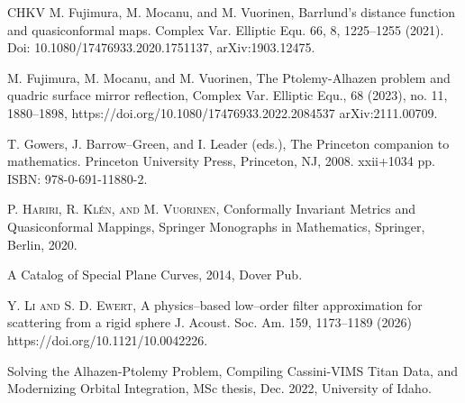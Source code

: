 \documentclass[12pt,a4paper]{amsart}
\theoremstyle{plain}
\theoremstyle{definition}
\theoremstyle{remark}
\numberwithin{equation}{section}
\begin{document}
\begin{thebibliography}{CHKV}
%
 {\sc
M. Fujimura, M. Mocanu, and M.  Vuorinen, } {Barrlund's distance function and
  quasiconformal maps}.
\newblock Complex Var. Elliptic Equ.  66,  8, 1225--1255 (2021).
\newblock Doi: 10.1080/17476933.2020.1751137, {arXiv:1903.12475}.

%
 {\sc
M. Fujimura, M. Mocanu, and M.  Vuorinen,} 
{The Ptolemy-Alhazen problem and quadric surface mirror reflection},
{Complex Var. Elliptic Equ.}, 68 (2023), no. 11, 1880--1898, 
{https://doi.org/10.1080/17476933.2022.2084537}
  {arXiv:2111.00709}. %
%

 {\sc T. Gowers, J. Barrow--Green, and I. Leader (eds.),} {The Princeton companion to mathematics. } Princeton University Press, Princeton, NJ, 2008. xxii+1034 pp. ISBN: 978-0-691-11880-2.

 \textsc{P. Hariri, R. Kl\'en, and M. Vuorinen},  
Conformally Invariant 
{M}etrics  and Quasiconformal Mappings, Springer Monographs in Mathematics, 
Springer, Berlin, 2020.

 A Catalog of Special Plane Curves, 2014, Dover Pub.

 \textsc{Y. Li and S. D. Ewert,}
A physics--based low--order filter approximation for
scattering from a rigid sphere
J. Acoust. Soc. Am. 159, 1173--1189 (2026)
https://doi.org/10.1121/10.0042226.


 Solving the Alhazen-Ptolemy Problem, 
Compiling Cassini-VIMS Titan Data, and Modernizing Orbital Integration,
MSc thesis, Dec. 2022, University of Idaho.
\newblock



\end{thebibliography}
\end{document}

